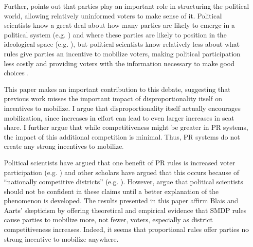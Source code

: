 \documentclass[12pt]{article}
\begin{document}
Further, \cite{Sniderman2000} points out that parties play an important role in structuring the political world, allowing relatively uninformed voters to make sense of it. Political scientists know a great deal about how many parties are likely to emerge in a political system (e.g. \citealt{Cox1997, ChhibberKollman1998, ClarkGolder2006}) and where these parties are likely to position in the ideological space (e.g. \citealt{Cox1990, KollmanMillerPage1992, AdamsMerrillGrofman2005}), but political scientists know relatively less about what rules give parties an incentive to mobilize voters, making political participation less costly and providing voters with the information necessary to make good choices \citep{Downs1957}.


This paper makes an important contribution to this debate, suggesting that previous work misses the important impact of disproportionality itself on incentives to mobilize. I argue that disproportionality itself actually encourages mobilization, since increases in effort can lead to even larger increases in seat share. I further argue that while competitiveness might be greater in PR systems, the impact of this additional competition is minimal. Thus, PR systems do not create any strong incentives to mobilize.

Political scientists have argued that one benefit of PR rules is increased voter participation (e.g. \citealt{Lijphart1997}) and other scholars have argued that this occurs because of ``nationally competitive districts'' (e.g. \citealt{Powell1986}). However, \cite{BlaisAarts2006} argue that political scientists should not be confident in these claims until a better explanation of the phenomenon is developed. The results presented in this paper affirm Blais and Aarts' skepticism by offering theoretical and empirical evidence that SMDP rules cause parties to mobilize more, not fewer, voters, especially as district competitiveness increases. Indeed, it seems that proportional rules offer parties no strong incentive to mobilize anywhere.

\singlespace 
\normalsize
\singlespace


\end{document}
